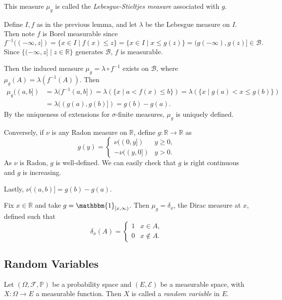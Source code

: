 \documentclass[12pt]{article}
\begin{document}
This measure $\mu_g$ is called the \emph{Lebesgue-Stieltjes measure} associated with $g$.

\begin{proofbox}
	Define $I, f$ as in the previous lemma, and let $\lambda$ be the Lebesgue measure on $I$. Then note $f$ is Borel measurable since
	\[
		f^{-1}((-\infty, z]) = \{x \in I \mid f(x) \leq z\} = \{x \in I \mid x \leq g(z)\} = (g(-\infty),g(z)] \in \mathcal{B}.
	\]
	Since $\{(-\infty, z] \mid z \in \mathbb{R}\}$ generates $\mathcal{B}$, $f$ is measurable.

	Then the induced measure $\mu_g = \lambda \circ f^{-1}$ exists on $\mathcal{B}$, where $\mu_g(A) = \lambda(f^{-1}(A))$. Then
	\begin{align*}
		\mu_g((a,b]) &= \lambda(f^{-1}(a,b]) = \lambda(\{x \mid a < f(x) \leq b\}) = \lambda(\{ x \mid g(a) < x \leq g(b)\}) \\
			     &= \lambda((g(a), g(b)]) = g(b) - g(a).
	\end{align*}
	By the uniqueness of extensions for $\sigma$-finite measures, $\mu_g$ is uniquely defined.

	Conversely, if $\nu$ is any Radon measure on $\mathbb{R}$, define $g : \mathbb{R} \to \mathbb{R}$ as
	\[
	g(y) = 
	\begin{cases}
		\nu((0,y]) &y \geq 0,\\
		-\nu((y,0]) &y > 0.
	\end{cases}
	\]
	As $\nu$ is Radon, $g$ is well-defined. We can easily check that $g$ is right continuous and $g$ is increasing.

	Lastly, $\nu((a, b)] = g(b) - g(a)$.
\end{proofbox}

\begin{exbox}
	Fix $x \in \mathbb{R}$ and take $g = \mathbbm{1}_{[x,\infty)}$. Then $\mu_g = \delta_x$, the Dirac measure at $x$, defined such that
	\[
	\delta_x(A) =
	\begin{cases}
		1 &x \in A,\\
		0 & x \not \in A.
	\end{cases}
	\]
\end{exbox}

\subsection{Random Variables}
\label{sub:rv}

Let $(\Omega, \mathcal{F}, \mathbb{P})$ be a probability space and $(E, \mathcal{E})$ be a measurable space, with $X : \Omega \to E$ a measurable function. Then $X$ is called a \emph{random variable} in $E$.
\end{document}
